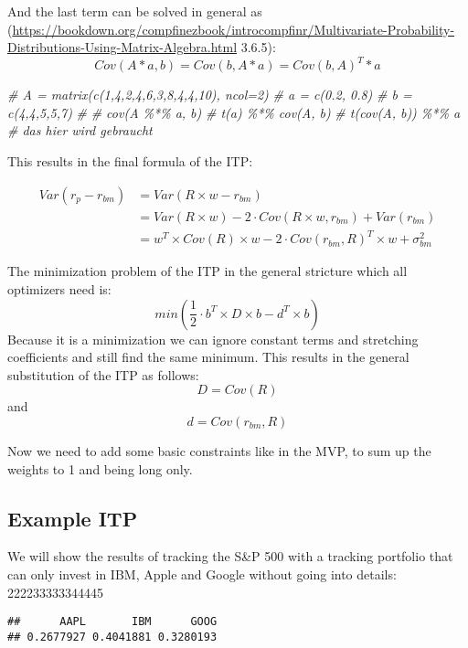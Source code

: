 \documentclass[
  oneside]{book}
\newenvironment{Shaded}{\begin{snugshade}}{\end{snugshade}}
\newcommand{\CommentTok}[1]{\textcolor[rgb]{0.56,0.35,0.01}{\textit{#1}}}
\begin{document}
And the last term can be solved in general as (\url{https://bookdown.org/compfinezbook/introcompfinr/Multivariate-Probability-Distributions-Using-Matrix-Algebra.html} 3.6.5):
\[
  Cov(A*a, b) = Cov(b, A*a) = Cov(b, A)^T * a
\]

\begin{Shaded}
\begin{Highlighting}[]
\CommentTok{\# A = matrix(c(1,4,2,4,6,3,8,4,4,10), ncol=2)}
\CommentTok{\# a = c(0.2, 0.8)}
\CommentTok{\# b = c(4,4,5,5,7)}
\CommentTok{\# }
\CommentTok{\# cov(A \%*\% a, b)}
\CommentTok{\# t(a) \%*\% cov(A, b)}
\CommentTok{\# t(cov(A, b)) \%*\% a \# das hier wird gebraucht}
\end{Highlighting}
\end{Shaded}

This results in the final formula of the ITP:

\begin{equation}
  \begin{split}
   Var(r_{p}-r_{bm}) & = Var(R \times w - r_{bm}) \\
   & = Var(R \times w) - 2 \cdot Cov(R \times w,r_{bm}) + Var(r_{bm})  \\
   & = w^T \times Cov(R) \times w - 2 \cdot Cov(r_{bm}, R)^T \times w + \sigma_{bm}^2
   \end{split}
   \label{eq:ITP}
\end{equation}

The minimization problem of the ITP in the general stricture which all optimizers need is:
\[
  min(\frac{1}{2} \cdot b^T \times D \times b -d^T \times b)
\]
Because it is a minimization we can ignore constant terms and stretching coefficients and still find the same minimum. This results in the general substitution of the ITP as follows:
\[
  D = Cov(R)
\]
and
\[
d = Cov(r_{bm}, R)
\]

Now we need to add some basic constraints like in the MVP, to sum up the weights to 1 and being long only.

\hypertarget{example-itp}{%
\subsection{Example ITP}\label{example-itp}}

We will show the results of tracking the S\&P 500 with a tracking portfolio that can only invest in IBM, Apple and Google without going into details:
222233333344445

\begin{verbatim}
##      AAPL       IBM      GOOG 
## 0.2677927 0.4041881 0.3280193
\end{verbatim}
\end{document}
